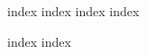 \documentclass[12pt,twoside,letterpaper]{memoir}
\begin{document}
\vspace*{\fill}
\newpage
%
\cleardoublepage

%





% 
% 
\cleardoublepage


\tableofcontents
\cleardoublepage

% 
\cleardoublepage


\mainmatter%


{index}
{index}
{index}
{index}

{index}
{index}

% 
% 
% 
% 

% 

% 
% 

\appendix



\backmatter%



% 



\printindex

\end{document}
